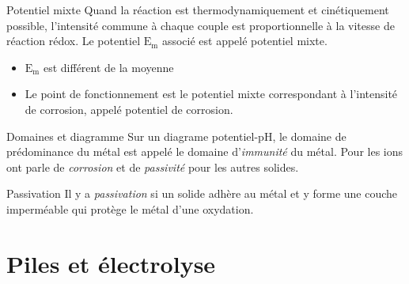 \documentclass[french, a4paper, 11pt, twocolumn]{article}
\begin{document}
    \begin{cadre}{Potentiel mixte}
        Quand la réaction est thermodynamiquement et cinétiquement possible,
        l'intensité commune à chaque couple est proportionnelle à la vitesse de 
        réaction rédox. Le potentiel \(\mathrm{E_m}\) associé est appelé potentiel mixte.
        

        \tcblower
        \begin{itemize}
            \item \(\mathrm{E_m}\) est différent de la moyenne
            \item Le point de fonctionnement est le potentiel mixte correspondant à l'intensité de corrosion,
                appelé potentiel de corrosion.
        \end{itemize}
        
    \end{cadre}

    \begin{cadre}{Domaines et diagramme}
        Sur un diagrame potentiel-pH, le domaine de prédominance du métal est appelé le domaine d'\emph{immunité} du métal.
        Pour les ions ont parle de \emph{corrosion} et de \emph{passivité} pour les autres solides.
    \end{cadre}

    \begin{cadre}{Passivation}
        Il y a \emph{passivation} si un solide adhère au métal et y forme une couche imperméable qui protège le métal d'une oxydation. 
    \end{cadre}

    \section{Piles et électrolyse}
\end{document}
